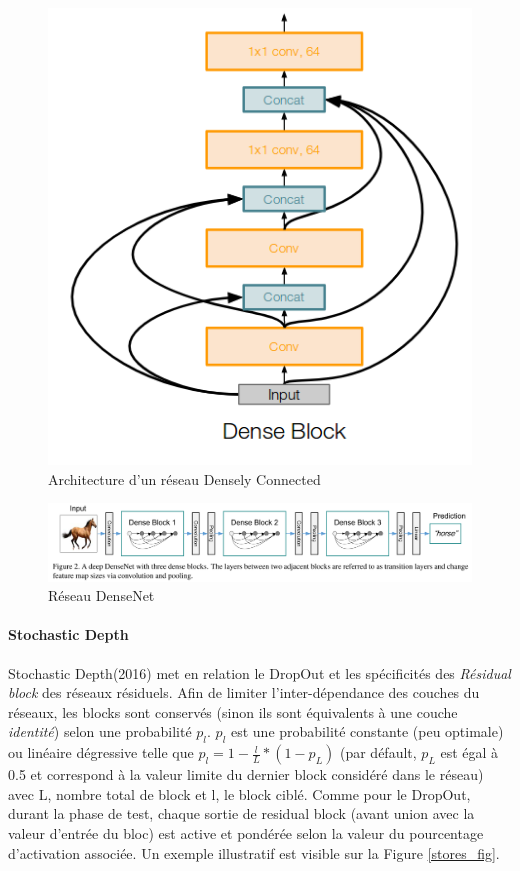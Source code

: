 \begin{figure}
    \centering
    \includegraphics[scale=0.4]{./tex/convolution-network/classifier/dense.png}
    \caption{Architecture d'un réseau Densely Connected}
    \label{densely}
\end{figure}


\begin{figure}
\hspace{-3cm}
    \includegraphics[scale=0.25]{./tex/convolution-network/classifier/densenet.png}
    \caption{Réseau DenseNet}
    \label{DenseNet}
\end{figure}

\paragraph{Stochastic Depth}

\noindent Stochastic Depth\cite{stores}(2016) met en relation le DropOut et les spécificités des \textit{Résidual block} des réseaux résiduels. Afin de limiter l'inter-dépendance des couches du réseaux, les blocks sont conservés (sinon ils sont équivalents à une couche \textit{identité}) selon une probabilité $p_l$. $p_l$ est une probabilité constante (peu optimale) ou linéaire dégressive telle que $p_l=1-\frac{l}{L}*(1-p_L)$ (par défault, $p_L$ est égal à 0.5 et correspond à la valeur limite du dernier block considéré dans le réseau) avec L, nombre total de block et l, le block ciblé. Comme pour le DropOut, durant la phase de test, chaque sortie de residual block (avant union avec la valeur d'entrée du bloc) est active et pondérée selon la valeur du pourcentage d'activation associée. Un exemple illustratif est visible sur la Figure \ref{stores_fig}.

